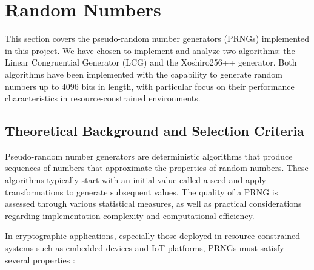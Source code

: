 \section{Random Numbers}

This section covers the pseudo-random number generators (PRNGs) implemented in this project. We have chosen to implement and analyze two algorithms: the Linear Congruential Generator (LCG) and the Xoshiro256++ generator. Both algorithms have been implemented with the capability to generate random numbers up to 4096 bits in length, with particular focus on their performance characteristics in resource-constrained environments.

\subsection{Theoretical Background and Selection Criteria}

Pseudo-random number generators are deterministic algorithms that produce sequences of numbers that approximate the properties of random numbers. These algorithms typically start with an initial value called a seed and apply transformations to generate subsequent values. The quality of a PRNG is assessed through various statistical measures, as well as practical considerations regarding implementation complexity and computational efficiency.

In cryptographic applications, especially those deployed in resource-constrained systems such as embedded devices and IoT platforms, PRNGs must satisfy several properties \cite{prng_iot}:

